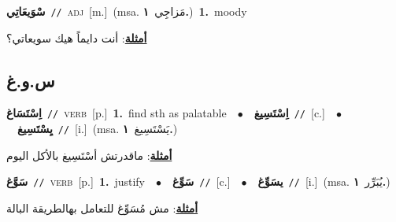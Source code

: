 \documentclass[10pt,a4paper,twoside]{article} %
\begin{document}
\begin{multicols}{2}
{\setlength\topsep{0pt}\textbf{\foreignlanguage{arabic}{سْوَيعَاتِي}}\ {\color{gray}\texttt{//}\color{black}}\ \textsc{adj}\ [m.]\ \color{gray}(msa. \foreignlanguage{arabic}{مَزاجِي}~\foreignlanguage{arabic}{\textbf{١.}})\color{black}\ \textbf{1.}~moody\  \begin{flushright}\color{gray}\foreignlanguage{arabic}{\textbf{\underline{\foreignlanguage{arabic}{أمثلة}}}: أنت دايماً هيك سويعاتي؟}\end{flushright}\color{black}} \vspace{2mm}

\vspace{-3mm}
\subsection*{\color{blue}\foreignlanguage{arabic}{س.و.غ}\color{blue}{}} 

{\setlength\topsep{0pt}\textbf{\foreignlanguage{arabic}{اِسْتَسَاغ}}\ {\color{gray}\texttt{//}\color{black}}\ \textsc{verb}\ [p.]\ \textbf{1.}~find sth as palatable\ \ $\bullet$\ \ \setlength\topsep{0pt}\textbf{\foreignlanguage{arabic}{اِسْتَسِيغ}}\ {\color{gray}\texttt{//}\color{black}}\ [c.]\ \ $\bullet$\ \ \setlength\topsep{0pt}\textbf{\foreignlanguage{arabic}{يِسْتَسِيغ}}\ {\color{gray}\texttt{//}\color{black}}\ [i.]\ \color{gray}(msa. \foreignlanguage{arabic}{يَسْتَسِيغ}~\foreignlanguage{arabic}{\textbf{١.}})\color{black}\  \begin{flushright}\color{gray}\foreignlanguage{arabic}{\textbf{\underline{\foreignlanguage{arabic}{أمثلة}}}: ماقدرتش أسْتَسِيغ بالأكل اليوم}\end{flushright}\color{black}} \vspace{2mm}

{\setlength\topsep{0pt}\textbf{\foreignlanguage{arabic}{سَوَّغ}}\ {\color{gray}\texttt{//}\color{black}}\ \textsc{verb}\ [p.]\ \textbf{1.}~justify\ \ $\bullet$\ \ \setlength\topsep{0pt}\textbf{\foreignlanguage{arabic}{سَوِّغ}}\ {\color{gray}\texttt{//}\color{black}}\ [c.]\ \ $\bullet$\ \ \setlength\topsep{0pt}\textbf{\foreignlanguage{arabic}{يسَوِّغ}}\ {\color{gray}\texttt{//}\color{black}}\ [i.]\ \color{gray}(msa. \foreignlanguage{arabic}{يُبَرِّر}~\foreignlanguage{arabic}{\textbf{١.}})\color{black}\  \begin{flushright}\color{gray}\foreignlanguage{arabic}{\textbf{\underline{\foreignlanguage{arabic}{أمثلة}}}: مش مُسَوِّغ للتعامل بهالطريقة البالة}\end{flushright}\color{black}} \vspace{2mm}


\end{multicols}
\end{document}
